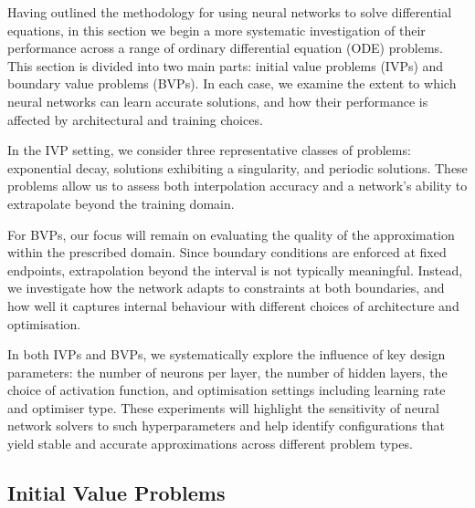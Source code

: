 Having outlined the methodology for using neural networks to solve differential equations, in this 
section we begin a more systematic investigation of their performance across a range of ordinary
differential equation (ODE) problems. This section is divided into two main parts: initial value 
problems (IVPs) and boundary value problems (BVPs). In each case, we examine the extent to which 
neural networks can learn accurate solutions, and how their performance is affected by architectural 
and training choices.

In the IVP setting, we consider three representative classes of problems: exponential decay,
solutions exhibiting a singularity, and periodic solutions. These problems allow us to assess 
both interpolation accuracy and a network's ability to extrapolate beyond the training domain.

For BVPs, our focus will remain on evaluating the quality of the approximation within the 
prescribed domain. Since boundary conditions are enforced at fixed endpoints, extrapolation 
beyond the interval is not typically meaningful. Instead, we investigate how the network adapts
to constraints at both boundaries, and how well it captures internal behaviour with different
choices of architecture and optimisation.

In both IVPs and BVPs, we systematically explore the influence of key design parameters: 
the number of neurons per layer, the number of hidden layers, the choice of activation function,
 and optimisation settings including learning rate and optimiser type. These experiments will 
 highlight the sensitivity of neural network solvers to such hyperparameters and help identify 
 configurations that yield stable and accurate approximations across different problem types.

\subsection{Initial Value Problems}\label{sec:IVPs}

\cite{goodfellow2016deep}


